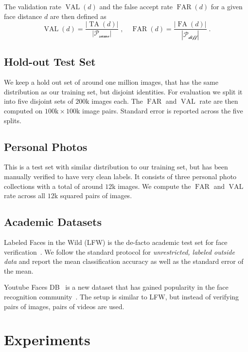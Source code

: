 \documentclass[10pt,twocolumn,letterpaper]{article}
\DeclareMathOperator{\far}{FAR}
\DeclareMathOperator{\val}{VAL}
\DeclareMathOperator{\fa}{FA}
\DeclareMathOperator{\ta}{TA}
\begin{document}
The validation rate $\val(d)$ and the false accept rate $\far(d)$ for a given
face distance $d$ are then defined as
\begin{equation}
  \val(d)=\frac{\left|\ta(d)\right|}{\left|\mathcal{P_\text{same}}\right|}\;,\quad
  \far(d)=\frac{\left|\fa(d)\right|}{\left|\mathcal{P_\text{diff}}\right|}\;.
\end{equation}

\subsection{Hold-out Test Set}
\label{hold_out_test}
We keep a hold out set of around one million images, that has the same
distribution as our training set, but disjoint identities. For evaluation we
split it into five disjoint sets of $200\text{k}$ images each. The $\far$ and
$\val$ rate are then computed on $100\text{k}\times100\text{k}$ image pairs.
Standard error is reported across the five splits.

\subsection{Personal Photos}
\label{personal_photos_test}
This is a test set with similar distribution to our training set, but has been
manually verified to have very clean labels. It consists of three personal
photo collections with a total of around $12\text{k}$ images. We compute the
$\far$ and $\val$ rate across all $\text{12k}$ squared pairs of images.

\subsection{Academic Datasets}

Labeled Faces in the Wild (LFW) is the de-facto academic test set for face
verification~\cite{lfw}. We follow the standard protocol for
\emph{unrestricted, labeled outside data} and report the mean classification
accuracy as well as the standard error of the mean.

Youtube Faces DB~\cite{ytf} is a new dataset that has gained popularity in
the face recognition community~\cite{deepface,deepid2plus}. The setup is
similar to LFW, but instead of verifying pairs of images, pairs of videos are
used.

\section{Experiments} \label{Experiments}
\end{document}
